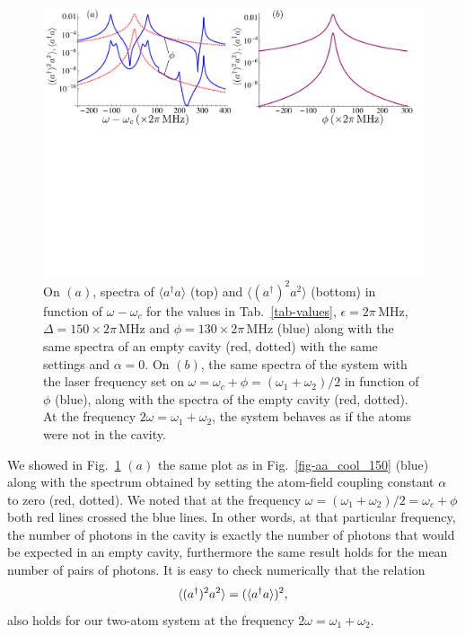 \begin{figure}
    \center
    \includegraphics[width=\textwidth]{Images/chap5/transparency.pdf}
    \caption[ $\langle a^\dagger a \rangle$ and $\langle (a^\dagger)^2 a^2 \rangle$ in function of $\omega-\omega_c$ ]{On $(a)$, spectra of $\langle a^\dagger a \rangle$ (top) and $\langle (a^\dagger)^2 a^2 \rangle$ (bottom) in function of $\omega-\omega_c$ for the values in Tab.~\ref{tab-values}, $\epsilon= 2\pi\,\mbox{MHz}$, $\Delta=150\times 2\pi\,\mbox{MHz}$ and $\phi=130\times 2\pi\,\mbox{MHz}$ (blue) along with the same spectra of an empty cavity (red, dotted) with the same settings and $\alpha=0$. On $(b)$, the same spectra of the system with the laser frequency set on $\omega = \omega_c + \phi = (\omega_1+\omega_2)/2$  in function of $\phi$ (blue), along with the spectra of the empty cavity (red, dotted). At the frequency $2\omega= \omega_1+\omega_2$, the system behaves as if the atoms were not in the cavity. }
    \label{fig-transparency}
\end{figure}

We showed in Fig.~\ref{fig-transparency} $(a)$ the same plot as in Fig.~\ref{fig-aa_cool_150} (blue) along with the spectrum obtained by setting the atom-field coupling constant $\alpha$ to zero (red, dotted). We noted that at the frequency $\omega= (\omega_1+\omega_2)/2=\omega_c+\phi$ both red lines crossed the blue lines. In other words, at that particular frequency, the number of photons in the cavity is exactly the number of photons that would be expected in an empty cavity, furthermore the same result holds for the mean number of pairs of photons. It is easy to check numerically that the relation
\[\langle (a^\dagger)^2 a^2 \rangle=(\langle a^\dagger a \rangle)^2,\]
also holds for our two-atom system at the frequency $2\omega= \omega_1+\omega_2$.

